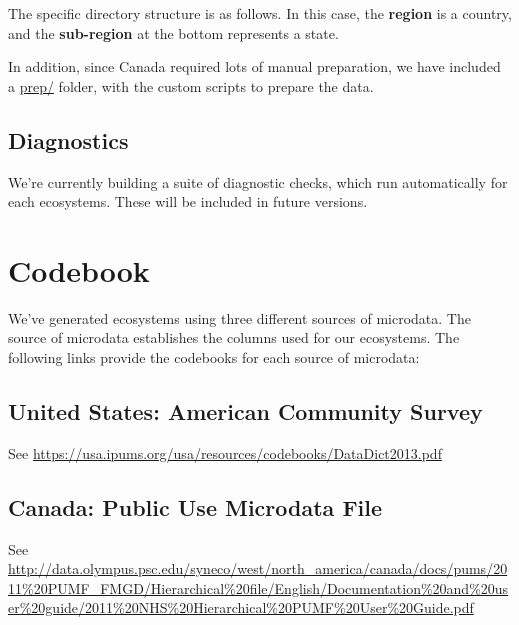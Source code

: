 \documentclass{article}
\begin{document}
The specific directory structure is as follows. In this case, the \textbf{region} is a country, and the \textbf{sub-region} at the bottom represents a state. 

\newpage
{}

In addition, since Canada required lots of manual preparation, we have included a \url{prep/} folder, with the custom scripts to prepare the data. 

\subsection{Diagnostics}
We're currently building a suite of diagnostic checks, which run automatically for each ecosystems. These will be included in future versions.

\newpage
\nocite{*}
\printbibliography

\newpage 
\appendix

\section{Codebook}
We've generated ecosystems using three different sources of microdata. The source of microdata establishes the columns used for our ecosystems. The following links provide the codebooks for each source of microdata:

\subsection{United States: American Community Survey}
	See \url{https://usa.ipums.org/usa/resources/codebooks/DataDict2013.pdf}

\subsection{Canada: Public Use Microdata File}
	See \url{http://data.olympus.psc.edu/syneco/west/north_america/canada/docs/pums/2011%20PUMF_FMGD/Hierarchical%20file/English/Documentation%20and%20user%20guide/2011%20NHS%20Hierarchical%20PUMF%20User%20Guide.pdf}
\end{document}
